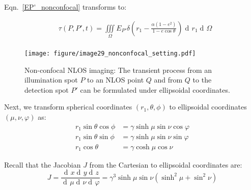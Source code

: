 \documentclass[10pt,journal,compsoc]{IEEEtran}
\DeclareMathOperator{\di}{d\!}
\begin{document}
\begin{appendices}
Eqn.~\ref{EP'_nonconfocal} transforms to:

\begin{equation}
\begin{aligned}
&\tau(P,P',t) = \underset{\Omega}\iiint{E_{P'} \delta\left(r_1 - \frac{\alpha (1 - e^{2})}{1 - e\cos{\theta}}\right) \di{r_1} \di{\Omega}} \\
\label{E-PP'}
\end{aligned}
\end{equation}




\begin{figure}[t!]
\centering
\texttt{[image: figure/image29\_nonconfocal\_setting.pdf]}
\caption{Non-confocal NLOS imaging: The transient process from an illumination spot $P$ to an NLOS point $Q$ and from $Q$ to the detection spot $P'$ can be formulated under ellipsoidal coordinates.}
\label{nonconfocalfigure}
\end{figure}

Next, we transform spherical coordinates $(r_1, \theta, \phi)$ to ellipsoidal coordinates $(\mu,\nu,\varphi)$ as:
\begin{equation}
\begin{aligned}
r_1 \sin{\theta} \cos{\phi} &= \gamma \sinh{\mu} \sin{\nu} \cos{\varphi} \\
r_1 \sin{\theta} \sin{\phi} &= \gamma \sinh{\mu} \sin{\nu} \sin{\varphi} \\
r_1 \cos{\theta} &= \gamma \cosh{\mu} \cos{\nu}
\label{prolate-spheroidal}
\end{aligned}
\end{equation}

Recall that the Jacobian $J$ from the Cartesian to ellipsoidal coordinates are:
\begin{equation}
J =  \frac{\di{x} \di{y} \di{z}}{\di{\mu} \di{\nu} \di{\varphi}} = \gamma^{3} \sinh{\mu} \sin{\nu} (\sinh^{2}{\mu} + \sin^{2}{\nu})
\end{equation}


\end{appendices}
\end{document}
